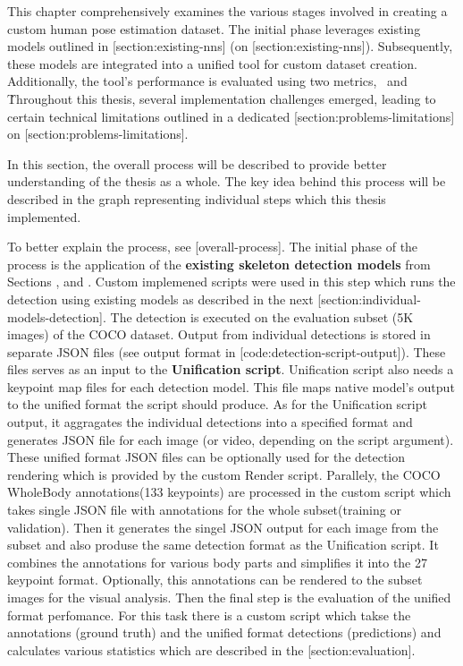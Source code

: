 This chapter comprehensively examines the various stages involved in creating a custom human pose estimation dataset. The initial phase leverages existing models outlined in [section:existing-nns] (on [section:existing-nns]). Subsequently, these models are integrated into a unified tool for custom dataset creation. Additionally, the tool's performance is evaluated using two metrics, \APE\ and \OKS\.

Throughout this thesis, several implementation challenges emerged, leading to certain technical limitations outlined in a dedicated [section:problems-limitations] on [section:problems-limitations].

In this section, the overall process will be described to provide better understanding of the thesis as a whole. The key idea behind this process will be described in the graph representing individual steps which this thesis implemented.


To better explain the process, see [overall-process]. The initial phase of the process is the application of the {\bf existing skeleton detection models} from Sections ,  and . Custom implemened scripts were used in this step which runs the detection using existing models as described in the next [section:individual-models-detection]. The detection is executed on the evaluation subset (5K images) of the COCO dataset. Output from individual detections is stored in separate JSON files (see output format in [code:detection-script-output]). These files serves as an input to the {\bf Unification script}. Unification script also needs a keypoint map files for each detection model. This file maps native model's output to the unified format the script should produce. As for the Unification script output, it aggragates the individual detections into a specified format and generates JSON file for each image (or video, depending on the script argument). These unified format JSON files can be optionally used for the detection rendering which is provided by the custom Render script. Parallely, the COCO WholeBody annotations(133 keypoints) are processed in the custom script which takes single JSON file with annotations for the whole subset(training or validation). Then it generates the singel JSON output for each image from the subset and also produse the same detection format as the Unification script. It combines the annotations for various body parts and simplifies it into the 27 keypoint format. Optionally, this annotations can be rendered to the subset images for the visual analysis. Then the final step is the evaluation of the unified format perfomance. For this task there is a custom script which takse the annotations (ground truth) and the unified format detections (predictions) and calculates various statistics which are described in the [section:evaluation].

